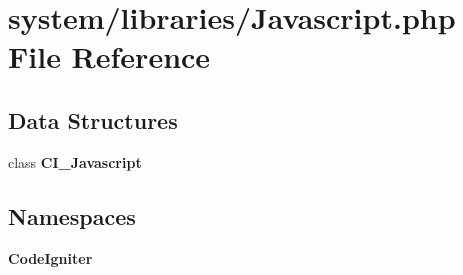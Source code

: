 \section{system/libraries/\-Javascript.php File Reference}
\label{_javascript_8php}
\subsection*{Data Structures}
\begin{DoxyCompactItemize}
\item 
class {\bf C\-I\-\_\-\-Javascript}
\end{DoxyCompactItemize}
\subsection*{Namespaces}
\begin{DoxyCompactItemize}
\item 
{\bf Code\-Igniter}
\end{DoxyCompactItemize}
